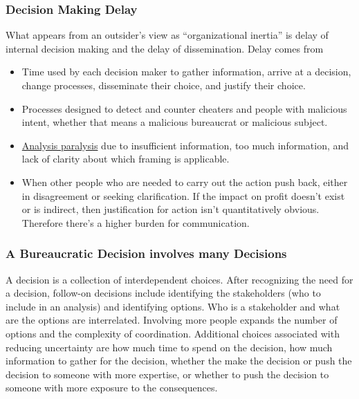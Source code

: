 \subsubsection{Decision Making Delay\label{sec:decision-delay}}

What appears from an outsider's view as ``organizational inertia'' is  delay of internal decision making and the delay of dissemination. 
Delay comes from
\begin{itemize}
    \item Time used by each decision maker to gather information, arrive at a decision, change processes, disseminate their choice, and justify their choice. 
    \item Processes designed to detect and counter cheaters and people with malicious intent, whether that means a malicious bureaucrat or malicious subject. 
\item \href{https://en.wikipedia.org/wiki/Analysis_paralysis}{Analysis paralysis} 
due to insufficient information, too much information, and lack of clarity about which framing is applicable.
\item When other people who are needed to carry out the action push back, either in disagreement or seeking clarification. If the impact on profit doesn't exist or is indirect, then justification for action isn't quantitatively obvious. Therefore there's a higher burden for communication.
\end{itemize}




\subsubsection{A Bureaucratic Decision involves many Decisions}

A decision is a collection of interdependent choices. After recognizing the need for a decision, follow-on decisions include identifying the stakeholders (who to include in an analysis) and identifying options. Who is a stakeholder and what are the options are interrelated. Involving more people expands the number of options and the complexity of coordination. Additional choices associated with reducing uncertainty are how much time to spend on the decision, how much information to gather for the decision, whether the make the decision or push the decision to someone with more expertise, or whether to push the decision to someone with more exposure to the consequences.

